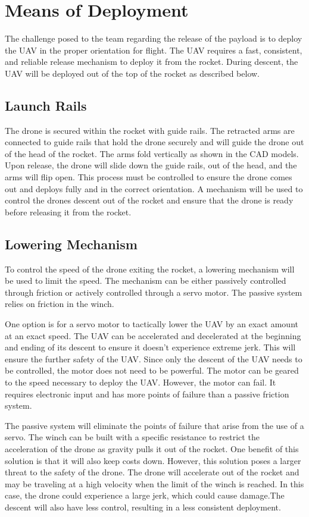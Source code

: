 \section{Means of Deployment}\label{PL:Tradeoffs:Deployment}
	The challenge posed to the team regarding the release of the payload is to deploy the UAV in the proper orientation for flight. The UAV requires a fast, consistent, and reliable release mechanism to deploy it from the rocket. During descent, the UAV will be deployed out of the top of the rocket as described below. 

	\subsection{Launch Rails}
		The drone is secured within the rocket with guide rails. The retracted arms are connected to guide rails that hold the drone securely and will guide the drone out of the head of the rocket. The arms fold vertically as shown in the CAD models. Upon release, the drone will slide down the guide rails, out of the head, and the arms will flip open. This process must be controlled to ensure the drone comes out and deploys fully and in the correct orientation. A mechanism will be used to control the drones descent out of the rocket and ensure that the drone is ready before releasing it from the rocket.

	\subsection{Lowering Mechanism}
		To control the speed of the drone exiting the rocket, a lowering mechanism will be used to limit the speed. The mechanism can be either passively controlled through friction or actively controlled through a servo motor. The passive system relies on friction in the winch. 

		One option is for a servo motor to tactically lower the UAV by an exact amount at an exact speed. The UAV can be accelerated and decelerated at the beginning and ending of its descent to ensure it doesn't experience extreme jerk. This will ensure the further safety of the UAV. Since only the descent of the UAV needs to be controlled, the motor does not need to be powerful. The motor can be geared to the speed necessary to deploy the UAV. However, the motor can fail. It requires electronic input and has more points of failure than a passive friction system.
	
		The passive system will eliminate the points of failure that arise from the use of a servo. The winch can be built with a specific resistance to restrict the acceleration of the drone as gravity pulls it out of the rocket. One benefit of this solution is that it will also keep costs down. However, this solution poses a larger threat to the safety of the drone. The drone will accelerate out of the rocket and may be traveling at a high velocity when the limit of the winch is reached. In this case, the drone could experience a large jerk, which could cause damage.The descent will also have less control, resulting in a less consistent deployment.
	
